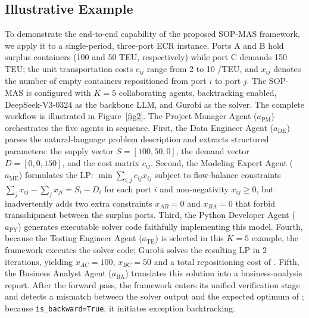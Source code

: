 \documentclass[preprint,12pt]{elsarticle}
\begin{document}
\subsection{Illustrative Example}\label{sec:illustrative_example}

To demonstrate the end-to-end capability of the proposed SOP-MAS framework, we apply it to a single-period, three-port ECR instance. Ports A and B hold surplus containers (100 and 50 TEU, respectively) while port C demands 150 TEU; the unit transportation costs $c_{ij}$ range from 2 to 10 \textyen/TEU, and $x_{ij}$ denotes the number of empty containers repositioned from port $i$ to port $j$. The SOP-MAS is configured with $K{=}5$ collaborating agents, backtracking enabled, DeepSeek-V3-0324 as the backbone LLM, and Gurobi as the solver. The complete workflow is illustrated in Figure~\ref{fig2}.
The Project Manager Agent ($a_{\text{PM}}$) orchestrates the five agents in sequence. First, the Data Engineer Agent ($a_{\text{DE}}$) parses the natural-language problem description and extracts structured parameters: the supply vector $S{=}[100,50,0]$, the demand vector $D{=}[0,0,150]$, and the cost matrix $c_{ij}$. Second, the Modeling Expert Agent ($a_{\text{ME}}$) formulates the LP: $\min \sum_{i,j}c_{ij}x_{ij}$ subject to flow-balance constraints $\sum_j x_{ij}-\sum_j x_{ji}=S_i-D_i$ for each port $i$ and non-negativity $x_{ij}\geq 0$, but inadvertently adds two extra constraints $x_{AB}{=}0$ and $x_{BA}{=}0$ that forbid transshipment between the surplus ports. Third, the Python Developer Agent ($a_{\text{PY}}$) generates executable solver code faithfully implementing this model. Fourth, because the Testing Engineer Agent ($a_{\text{TE}}$) is selected in this $K{=}5$ example, the framework executes the solver code; Gurobi solves the resulting LP in 2 iterations, yielding $x_{AC}{=}100$, $x_{BC}{=}50$ and a total repositioning cost of . Fifth, the Business Analyst Agent ($a_{\text{BA}}$) translates this solution into a business-analysis report. After the forward pass, the framework enters its unified verification stage and detects a mismatch between the solver output and the expected optimum of ; because \texttt{is\_backward=True}, it initiates exception backtracking.
\end{document}
